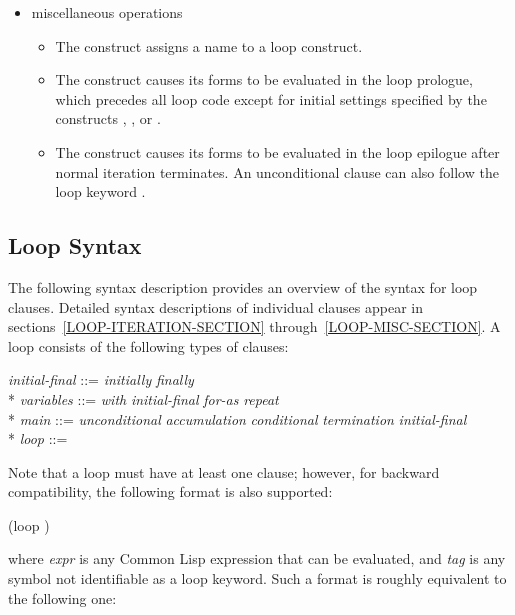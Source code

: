 \begin{new}
\begin{itemize}
  \item miscellaneous operations

  \begin{itemize}
  \item The  construct assigns a name to a loop construct.

  \item The  construct causes its forms to be evaluated
   in the loop prologue, which precedes all loop code except for initial 
   settings specified by the constructs , , or .

  \item  The  construct causes its forms to be evaluated
   in the loop epilogue after normal iteration terminates.  An unconditional
   clause can also follow the loop keyword .
  \end{itemize}
  \end{itemize}



  \subsection{Loop Syntax}

  The following syntax description provides an overview of the syntax
  for loop clauses.  Detailed syntax descriptions of individual clauses
  appear in sections~\ref{LOOP-ITERATION-SECTION} through~\ref{LOOP-MISC-SECTION}.
  A loop consists of the
  following types of clauses:

\begin{tabbing}
{\it initial-final\/} ::= {\it initially\/} {\Mor} {\it finally\/} \\*
{\it variables\/} ::= {\it with\/} {\Mor} {\it initial-final\/} {\Mor} {\it for-as\/} {\Mor} {\it repeat} \\*
{\it main\/} ::= {\it unconditional\/} {\Mor} {\it accumulation\/} {\Mor} {\it conditional\/} 
      {\Mor} {\it termination\/} {\Mor} {\it initial-final\/} \\*
{\it loop\/} ::= 
\end{tabbing}

Note that a loop must have at least one clause; however, for
backward compatibility, the following format is also supported:
\begin{lisp}
(loop )
\end{lisp}
where {\it expr} is any Common Lisp expression that can be evaluated, and 
{\it tag} is any symbol not identifiable as a loop keyword.  Such a format
is roughly equivalent to the following one:


\end{new}
